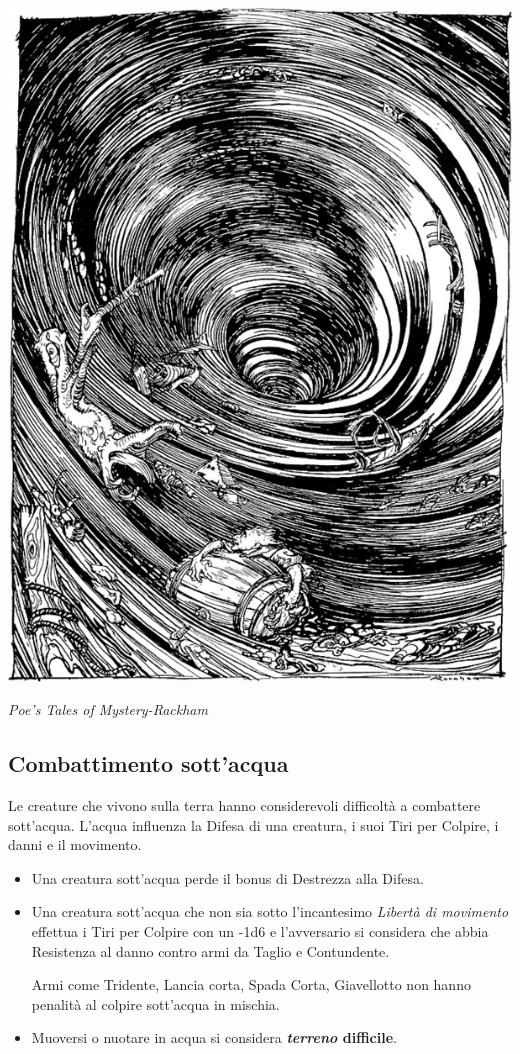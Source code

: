 \begin{multicols}{2}
\begin{center}
\includegraphics[width=0.75\linewidth]{immagini/Poe's_Tales_of_Mystery-Rackham-047_grayscale.png}

\emph{Poe's Tales of Mystery-Rackham}
\end{center}


\subsection{Combattimento sott'acqua}\label{combatteresottacqua}\hypertarget{combatteresottacqua}{}
Le creature che vivono sulla terra hanno considerevoli difficoltà a combattere sott'acqua. L'acqua influenza la Difesa di una creatura, i suoi Tiri per Colpire, i danni e il movimento.

\begin{itemize}[leftmargin=*] \setlength{\itemsep}{0pt}
\item
Una creatura sott'acqua perde il bonus di Destrezza alla Difesa.
\item
Una creatura sott'acqua che non sia sotto l'incantesimo \emph{Libertà di movimento} effettua i Tiri per Colpire con un -1d6 e l'avversario si considera che abbia Resistenza al danno contro armi da Taglio e Contundente.

Armi come Tridente, Lancia corta, Spada Corta, Giavellotto non hanno penalità al colpire sott'acqua in mischia.
\item
Muoversi o nuotare in acqua si considera \textbf{\emph{terreno} difficile}.
\end{itemize}


\end{multicols}
